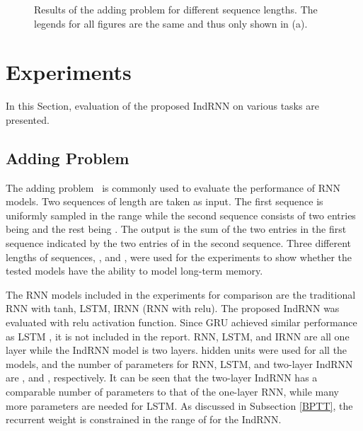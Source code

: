 \documentclass[10pt,twocolumn,letterpaper]{article}
\begin{document}
\begin{figure*}[tbp]
	\centering
	\hspace{0.5cm}
	\hspace{0.5cm}
	\caption{Results of the adding problem for different sequence lengths. The legends for all figures are the same and thus only shown in (a).} 
	\label{adding}
\end{figure*}


\section{Experiments}
In this Section, evaluation of the proposed IndRNN on various tasks are presented.

\subsection{Adding Problem}
\label{addingdesc}
The adding problem~\cite{hochreiter1997long, arjovsky2015unitary} is commonly used to evaluate the performance of RNN models. Two sequences of length  are taken as input. The first sequence is uniformly sampled in the range  while the second sequence consists of two entries being  and the rest being . The output is the sum of the two entries in the first sequence indicated by the two entries of  in the second sequence. Three different lengths of sequences, ,  and , were used for the experiments to show whether the tested models have the ability to model long-term memory.
 
The RNN models included in the experiments for comparison are the traditional RNN with tanh, LSTM, IRNN (RNN with relu). The proposed IndRNN was evaluated with relu activation function. Since GRU achieved similar performance as LSTM \cite{jozefowicz2015empirical}, it is not included in the report. RNN, LSTM, and IRNN are all one layer while the IndRNN model is two layers.  hidden units were used for all the models, and the number of parameters for RNN, LSTM, and two-layer IndRNN are ,  and , respectively. It can be seen that the two-layer IndRNN has a comparable number of parameters to that of the one-layer RNN, while many more parameters are needed for LSTM. As discussed in Subsection \ref{BPTT}, the recurrent weight is constrained in the range of  for the IndRNN. 
\end{document}
